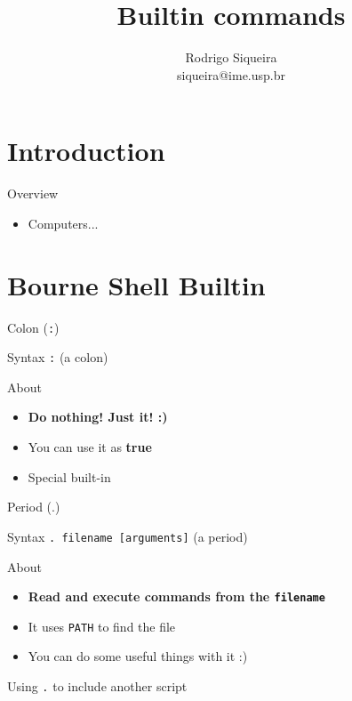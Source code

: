 \documentclass[10pt, compress, aspectratio=169]{beamer}
\title{Builtin commands}
\author{\footnotesize Rodrigo Siqueira \\ {\scriptsize siqueira@ime.usp.br}}
\begin{document}
\maketitle

\section{Introduction}
\begin{frame}{Overview}
  \begin{itemize}
    \item Computers...
  \end{itemize}
\end{frame}

\section{Bourne Shell Builtin}
\begin{frame}{Colon (\texttt{:})}
  \begin{alertblock}{Syntax}
    \texttt{:} (a colon)
  \end{alertblock}

  \begin{exampleblock}{About}
    \begin{itemize}
      \item \textbf{Do nothing! Just it! :)}
      \item You can use it as \textbf{true}
      \item Special built-in
    \end{itemize}
  \end{exampleblock}
\end{frame}

\begin{frame}{Period (.)}
  \begin{alertblock}{Syntax}
    \texttt{. filename [arguments]} (a period)
  \end{alertblock}

  \begin{exampleblock}{About}
    \begin{itemize}
      \item \textbf{Read and execute commands from the \texttt{filename}}
      \item It uses \texttt{PATH} to find the file
      \item You can do some useful things with it :)
    \end{itemize}
  \end{exampleblock}

  Using \texttt{.} to include another script

  
\end{frame}
\end{document}
